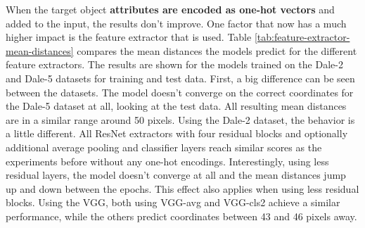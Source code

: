 When the target object \textbf{attributes are encoded as one-hot vectors} and added to the input, the results don't improve.
One factor that now has a much higher impact is the feature extractor that is used.
Table \ref{tab:feature-extractor-mean-distances} compares the mean distances the models predict for the different feature extractors.
The results are shown for the models trained on the Dale-2 and Dale-5 datasets for training and test data.
First, a big difference can be seen between the datasets.
The model doesn't converge on the correct coordinates for the Dale-5 dataset at all, looking at the test data.
All resulting mean distances are in a similar range around 50 pixels.
Using the Dale-2 dataset, the behavior is a little different.
All ResNet extractors with four residual blocks and optionally additional average pooling and classifier layers reach similar scores as the experiments before without any one-hot encodings.
Interestingly, using less residual layers, the model doesn't converge at all and the mean distances jump up and down between the epochs.
This effect also applies when using less residual blocks.
Using the VGG, both using VGG-avg and VGG-cls2 achieve a similar performance, while the others predict coordinates between 43 and 46 pixels away.

